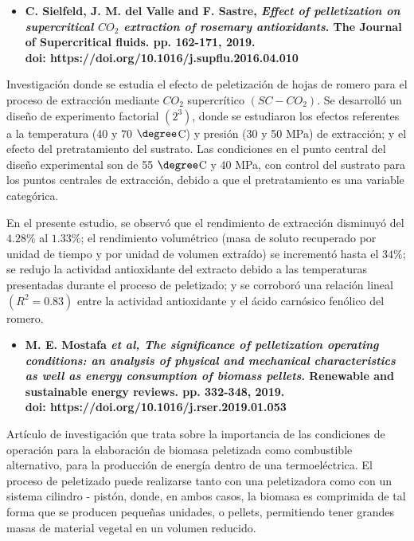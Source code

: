 \begin{itemize}
	\item{\textbf{C. Sielfeld, J. M. del Valle and F. Sastre, \textit{Effect of pelletization on supercritical $CO_2$ extraction of rosemary antioxidants}. The Journal of Supercritical fluids. pp. 162-171, 2019. \\doi: https://doi.org/10.1016/j.supflu.2016.04.010}}
\end{itemize}

\noindent
\justify

Investigaci\'on donde se estudia el efecto de peletizaci\'on de hojas de romero para el proceso de extracci\'on mediante $CO_2$ supercr\'itico $\left(SC-CO_2 \right)$. Se desarroll\'o un dise\~no de experimento factorial $\left(2^3 \right)$, donde se estudiaron los efectos referentes a la temperatura (40 y 70 $\degree$C) y presi\'on (30 y 50 MPa) de extracci\'on; y el efecto del pretratamiento del sustrato. Las condiciones en el punto central del dise\~no experimental son de 55 $\degree$C y 40 MPa, con control del sustrato para los puntos centrales de extracci\'on, debido a que el pretratamiento es una variable categ\'orica. 

\noindent
\justify

En el presente estudio, se observ\'o que el rendimiento de extracci\'on disminuy\'o del $4.28 \%$ al $1.33 \%$; el rendimiento volum\'etrico (masa de soluto recuperado por unidad de tiempo y por unidad de volumen extra\'ido) se increment\'o hasta el $34 \%$; se redujo la actividad antioxidante del extracto debido a las temperaturas presentadas durante el proceso de peletizado; y se corrobor\'o una relaci\'on lineal $\left( R^2 = 0.83 \right)$ entre la actividad antioxidante y el \'acido carn\'osico fen\'olico del romero.

\begin{itemize}
	\item{\textbf{M. E. Mostafa \textit{et al, The significance of pelletization operating conditions: an analysis of physical and mechanical characteristics as well as energy consumption of biomass pellets}. Renewable and sustainable energy reviews. pp. 332-348, 2019. \\
	doi: https://doi.org/10.1016/j.rser.2019.01.053}}
\end{itemize}

\noindent
\justify

Art\'iculo de investigaci\'on que trata sobre la importancia de las condiciones de operaci\'on para la elaboraci\'on de biomasa peletizada como combustible alternativo, para la producci\'on de energ\'ia dentro de una termoel\'ectrica. El proceso de peletizado puede realizarse tanto con una peletizadora como con un sistema cilindro - pist\'on, donde, en ambos casos, la biomasa es comprimida de tal forma que se producen peque\~nas unidades, o pellets, permitiendo tener grandes masas de material vegetal en un volumen reducido. 

